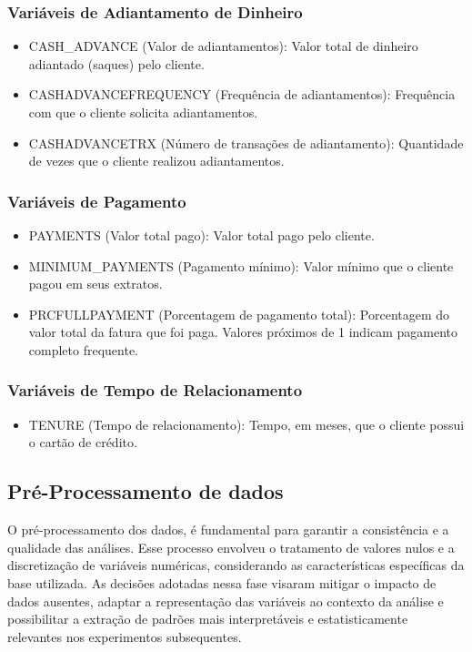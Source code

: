 \documentclass[12pt]{article}
\begin{document}
\subsubsection{Variáveis de Adiantamento de Dinheiro}
\begin{itemize}
    \item CASH\_ADVANCE (Valor de adiantamentos): Valor total de dinheiro adiantado (saques) pelo cliente.
    \item CASHADVANCEFREQUENCY (Frequência de adiantamentos): Frequência com que o cliente solicita adiantamentos.
    \item CASHADVANCETRX (Número de transações de adiantamento): Quantidade de vezes que o cliente realizou adiantamentos.
\end{itemize}

\subsubsection{Variáveis de Pagamento}
\begin{itemize}
    \item PAYMENTS (Valor total pago): Valor total pago pelo cliente.
    \item MINIMUM\_PAYMENTS (Pagamento mínimo): Valor mínimo que o cliente pagou em seus extratos.
    \item PRCFULLPAYMENT (Porcentagem de pagamento total): Porcentagem do valor total da fatura que foi paga. Valores próximos de 1 indicam pagamento completo frequente.
\end{itemize}

\subsubsection{Variáveis de Tempo de Relacionamento}
\begin{itemize}
    \item TENURE (Tempo de relacionamento): Tempo, em meses, que o cliente possui o cartão de crédito.
\end{itemize}

\subsection{Pré-Processamento de dados}

\hspace{1.2cm}O pré-processamento dos dados, é fundamental para garantir a consistência e a qualidade das análises. Esse processo envolveu o tratamento de valores nulos e a discretização de variáveis numéricas, considerando as características específicas da base utilizada. As decisões adotadas nessa fase visaram mitigar o impacto de dados ausentes, adaptar a representação das variáveis ao contexto da análise e possibilitar a extração de padrões mais interpretáveis e estatisticamente relevantes nos experimentos subsequentes.
\end{document}
